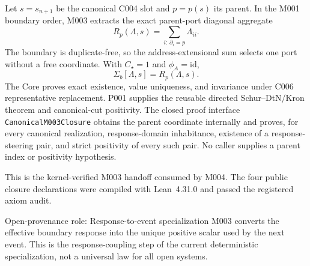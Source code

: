 Let $s=s_{n+1}$ be the canonical C004 slot and $p=p(s)$ its parent.  In the
M001 boundary order, M003 extracts the exact parent-port diagonal aggregate
\[
 R_p(\Lambda,s)=\sum_{i:\,\partial_i=p}\Lambda_{ii}.
\]
The boundary is duplicate-free, so the address-extensional sum selects one
port without a free coordinate.  With $C_\star=1$ and $\phi_A=\mathrm{id}$,
\[
 \boxed{\Sigma_b[\Lambda,s]=R_p(\Lambda,s).}
\]
The Core proves exact existence, value uniqueness, and invariance under C006
representative replacement.  P001 supplies the reusable directed
Schur--DtN/Kron theorem and canonical-cut positivity.  The closed proof
interface \texttt{CanonicalM003Closure} obtains the parent coordinate
internally and proves, for every canonical realization, response-domain
inhabitance, existence of a response-steering pair, and strict positivity of
every such pair.  No caller supplies a parent index or positivity hypothesis.

This is the kernel-verified M003 handoff consumed by M004.  The four public closure declarations were compiled with Lean~4.31.0 and passed the registered axiom audit.

\begin{cnnaInfoBox}{Open-provenance role: Response-to-event specialization}
M003 converts the effective boundary response into the unique positive scalar used by the next event.  This is the response-coupling step of the current deterministic specialization, not a universal law for all open systems.
\end{cnnaInfoBox}
